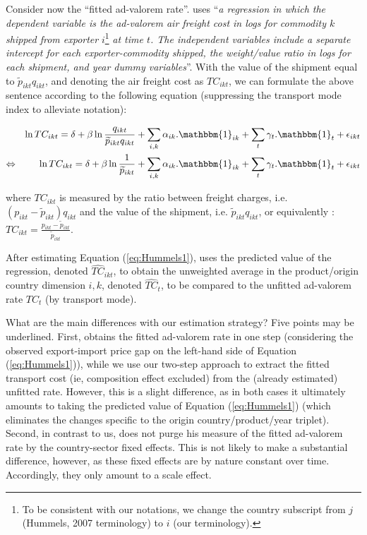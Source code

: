 \documentclass[a4paper,11pt]{article}
\begin{document}
Consider now the ``fitted ad-valorem rate''.
\cite{hummels2007} uses ``\textit{a regression in which the dependent variable is the ad-valorem air freight cost in logs for commodity $k$ shipped from exporter} $i$\footnote{To be consistent with our notations, we change the country subscript from $j$ (Hummels, 2007 terminology) to $i$ (our terminology).} \textit{at time $t$.
The independent variables include a separate intercept for each exporter-commodity shipped, the weight/value ratio in logs for each shipment, and year dummy variables}''.
With the value of the shipment equal to $\widetilde{p}_{ikt}q_{ikt}$, and denoting the air freight cost as $TC_{ikt}$, we can formulate the above sentence according to the following equation (suppressing the transport mode index to alleviate notation):

\begin{eqnarray}
&&\ln TC_{ikt} = \delta+ \beta \ln \frac{q_{ikt}}{\widetilde{p}_{ikt}q_{ikt}} + \sum_{i,k}\alpha_{ik}.\mathbbm{1}_{ik}+ \sum_{t}\gamma_{t}.\mathbbm{1}_{t} + \epsilon_{ikt} \notag \\
\Leftrightarrow && \ln TC_{ikt} = \delta+ \beta \ln \frac{1}{\widetilde{p}_{ikt}} + \sum_{i,k}\alpha_{ik}.\mathbbm{1}_{ik}+ \sum_{t}\gamma_{t}.\mathbbm{1}_{t} + \epsilon_{ikt} \label{eq:Hummels1}
\end{eqnarray}

\noindent where $TC_{ikt}$ is measured by the ratio between freight charges, i.e.
$(p_{ikt} - \widetilde{p}_{ikt})q_{ikt}$ and the value of the shipment, i.e.
$\widetilde{p}_{ikt}q_{ikt}$, or equivalently : $TC_{ikt} = \frac{p_{ikt} - \widetilde{p}_{ikt}}{\widetilde{p}_{ikt}}$.\medskip

After estimating Equation (\ref{eq:Hummels1}), \cite{hummels2007} uses the predicted value of the regression, denoted $\widehat{TC}_{ikt}$, to obtain the unweighted average in the product/origin country dimension $i,k$, denoted $\widehat{TC}_{t}$, to be compared to the unfitted ad-valorem rate $TC_{t}$ (by transport mode).\medskip

What are the main differences with our estimation strategy? Five points may be underlined.
First, \cite{hummels2007} obtains the fitted ad-valorem rate in one step (considering the observed export-import price gap on the left-hand side of Equation (\ref{eq:Hummels1})), while we use our two-step approach to extract the fitted transport cost (ie, composition effect excluded) from the (already estimated) unfitted rate.
However, this is a slight difference, as in both cases it ultimately amounts to taking the predicted value of Equation (\ref{eq:Hummels1}) (which eliminates the changes specific to the origin country/product/year triplet).
Second, in contrast to us, \cite{hummels2007} does not purge his measure of the fitted ad-valorem rate by the country-sector fixed effects.
This is not likely to make a substantial difference, however, as these fixed effects are by nature constant over time. Accordingly, they only amount to a scale effect.
\end{document}
